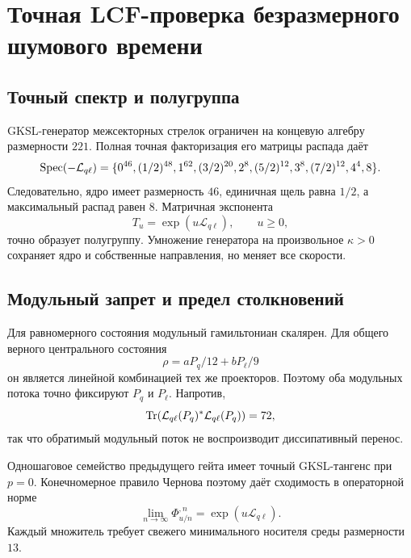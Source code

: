 \chapter{Точная LCF-проверка безразмерного шумового времени}
\label{ch:v8-intrinsic-noise-clock-lcf-migration-gate}

\section{Точный спектр и полугруппа}

GKSL-генератор межсекторных стрелок ограничен на концевую алгебру размерности $221$.
Полная точная факторизация его матрицы распада даёт
\begin{equation}
 \operatorname{Spec}(-\mathcal L_{q\ell})=
 \{0^{46},(1/2)^{48},1^{62},(3/2)^{20},2^8,(5/2)^{12},
 3^8,(7/2)^{12},4^4,8\}.
 \label{eq:v8-lcf-noise-clock-spectrum}
\end{equation}
Следовательно, ядро имеет размерность $46$, единичная щель равна $1/2$, а
максимальный распад равен $8$. Матричная экспонента
\begin{equation}
 T_u=\exp(u\mathcal L_{q\ell}),\qquad u\ge0,
\end{equation}
точно образует полугруппу. Умножение генератора на произвольное $\kappa>0$
сохраняет ядро и собственные направления, но меняет все скорости.

\section{Модульный запрет и предел столкновений}

Для равномерного состояния модульный гамильтониан скалярен. Для общего
верного центрального состояния
\begin{equation}
 \rho=aP_q/12+bP_\ell/9
\end{equation}
он является линейной комбинацией тех же проекторов. Поэтому оба модульных
потока точно фиксируют $P_q$ и $P_\ell$. Напротив,
\begin{equation}
 \operatorname{Tr}\!\left(\mathcal L_{q\ell}(P_q)^*
                  \mathcal L_{q\ell}(P_q)\right)=72,
\end{equation}
так что обратимый модульный поток не воспроизводит диссипативный перенос.

Одношаговое семейство предыдущего гейта имеет точный GKSL-тангенс при
$p=0$. Конечномерное правило Чернова поэтому даёт сходимость в операторной
норме
\begin{equation}
 \lim_{n\to\infty}\Phi_{u/n}^{,n}=\exp(u\mathcal L_{q\ell}).
 \label{eq:v8-lcf-collision-limit}
\end{equation}
Каждый множитель требует свежего минимального носителя среды размерности
$13$.

